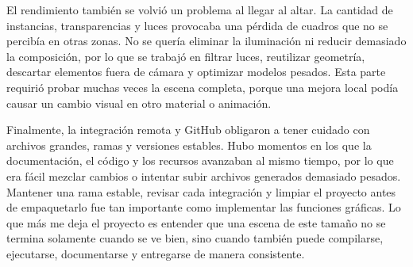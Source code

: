\documentclass[letter,12pt]{article}
\begin{document}
El rendimiento también se volvió un problema al llegar al altar. La cantidad de instancias, transparencias y luces provocaba una pérdida de cuadros que no se percibía en otras zonas. No se quería eliminar la iluminación ni reducir demasiado la composición, por lo que se trabajó en filtrar luces, reutilizar geometría, descartar elementos fuera de cámara y optimizar modelos pesados. Esta parte requirió probar muchas veces la escena completa, porque una mejora local podía causar un cambio visual en otro material o animación.

Finalmente, la integración remota y GitHub obligaron a tener cuidado con archivos grandes, ramas y versiones estables. Hubo momentos en los que la documentación, el código y los recursos avanzaban al mismo tiempo, por lo que era fácil mezclar cambios o intentar subir archivos generados demasiado pesados. Mantener una rama estable, revisar cada integración y limpiar el proyecto antes de empaquetarlo fue tan importante como implementar las funciones gráficas. Lo que más me deja el proyecto es entender que una escena de este tamaño no se termina solamente cuando se ve bien, sino cuando también puede compilarse, ejecutarse, documentarse y entregarse de manera consistente.
\end{document}
